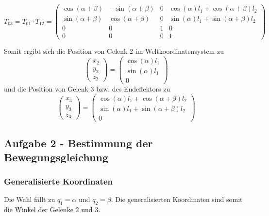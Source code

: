 \documentclass{MSM_latex}
\begin{document}
\begin{equation*}
	T_{03} = T_{01} \cdot T_{12} = \begin{pmatrix}
	\cos(\alpha + \beta) & -\sin(\alpha + \beta) & 0 & \cos(\alpha) l_1 + \cos(\alpha + \beta) l_2\\
	\sin(\alpha + \beta) & \cos(\alpha + \beta) & 0 & \sin(\alpha) l_1 + \sin(\alpha + \beta) l_2 \\
	0 & 0 & 1 & 0 \\
	0 & 0 & 0 & 1
	\end{pmatrix}
\end{equation*}

Somit ergibt sich die Position von Gelenk 2 im Weltkoordinatensystem zu
\begin{equation*}
	\begin{pmatrix} x_2 \\ y_2 \\ z_2 \end{pmatrix} = \begin{pmatrix}
	\cos(\alpha) l_1\\ \sin(\alpha) l_1 \\ 0 \end{pmatrix}
\end{equation*}
und die Position von Gelenk 3 bzw. des Endeffektors zu
\begin{equation*}
	\begin{pmatrix} x_3 \\ y_3 \\ z_3 \end{pmatrix} = 
	\begin{pmatrix}
	\cos(\alpha) l_1 + \cos(\alpha + \beta) l_2\\ \sin(\alpha) l_1 + \sin(\alpha + \beta) l_2 \\ 0 
	\end{pmatrix}
\end{equation*}

\subsection*{Aufgabe 2 - Bestimmung der Bewegungsgleichung}

\subsubsection*{Generalisierte Koordinaten}
Die Wahl fällt zu $q_1 = \alpha$ und $q_2 = \beta$. Die generalisierten Koordinaten sind somit die Winkel der Gelenke 2 und 3.
\end{document}
